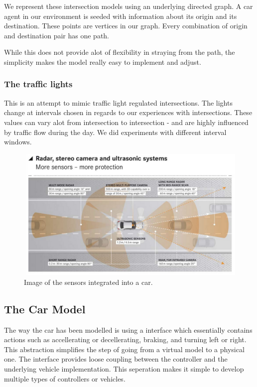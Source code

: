 
We represent these intersection models using an underlying directed graph.
 A car agent in our environment is seeded with information about its origin and its destination.
These points are vertices in our graph. 
Every combination of origin and destination pair has one path.

While this does not provide alot of flexibility in straying from the path, the simplicity makes the model really easy to implement and adjust.

\subsubsection{The traffic lights}
This is an attempt to mimic traffic light regulated intersections.
The lights change at intervals chosen in regards to our experiences with intersections. 
These values can vary alot from intersection to intersection - and are highly influenced by traffic flow during the day. 
We did experiments with different interval windows.

\begin{figure}
\centering
\includegraphics[scale=.2]{img/tesla_sensor}
\caption{Image of the sensors integrated into a car.}
\label{figure:tesla_sens}
\end{figure}

\subsection{The Car Model}
The way the car has been modelled is using a interface which essentially contains actions such as accellerating or decellerating, braking, and turning left or right.
This abstraction simplifies the step of going from a virtual model to a physical one.
The interface provides loose coupling between the controller and the underlying vehicle implementation.
This seperation makes it simple to develop multiple types of controllers or vehicles.

